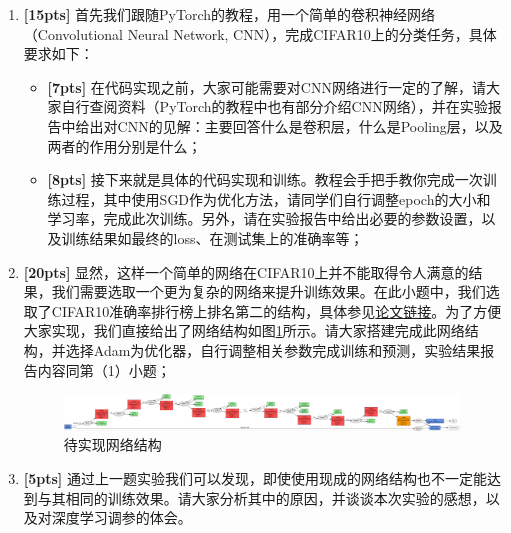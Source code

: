 \documentclass[a4paper,UTF8]{article}
\numberwithin{equation}{section}
\begin{document}
\begin{enumerate}[(1)]
	\item \textbf{[15pts]} 首先我们跟随PyTorch的教程，用一个简单的卷积神经网络（Convolutional Neural Network, CNN），完成CIFAR10上的分类任务，具体要求如下：
	
	\begin{itemize}
		\item \textbf{[7pts]} 在代码实现之前，大家可能需要对CNN网络进行一定的了解，请大家自行查阅资料（PyTorch的教程中也有部分介绍CNN网络），并在实验报告中给出对CNN的见解：主要回答什么是卷积层，什么是Pooling层，以及两者的作用分别是什么；
		\item \textbf{[8pts]} 接下来就是具体的代码实现和训练。教程会手把手教你完成一次训练过程，其中使用SGD作为优化方法，请同学们自行调整epoch的大小和学习率，完成此次训练。另外，请在实验报告中给出必要的参数设置，以及训练结果如最终的loss、在测试集上的准确率等；
	\end{itemize}
	\item \textbf{[20pts]} 显然，这样一个简单的网络在CIFAR10上并不能取得令人满意的结果，我们需要选取一个更为复杂的网络来提升训练效果。在此小题中，我们选取了CIFAR10准确率排行榜上排名第二的结构，具体参见\href{https://arxiv.org/pdf/1412.6806.pdf}{论文链接}。为了方便大家实现，我们直接给出了网络结构如图\ref{network_structure}所示。请大家搭建完成此网络结构，并选择Adam为优化器，自行调整相关参数完成训练和预测，实验结果报告内容同第（1）小题；
	\begin{figure}[!h]
		\centering   
		\includegraphics[width=0.99\textwidth, height=0.15\textwidth]{nn_structure.png}  
		\caption{待实现网络结构} 
		\label{network_structure}
	\end{figure}
	\item \textbf{[5pts]} 通过上一题实验我们可以发现，即使使用现成的网络结构也不一定能达到与其相同的训练效果。请大家分析其中的原因，并谈谈本次实验的感想，以及对深度学习调参的体会。
\end{enumerate}
\end{document}
